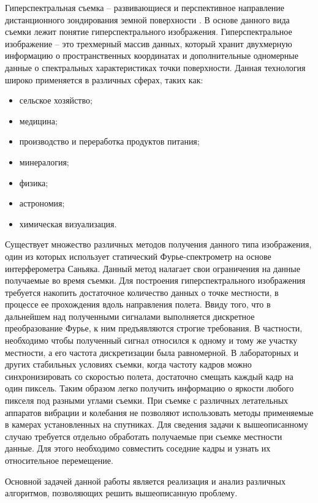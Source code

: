 \label{sec:intro}
Гиперспектральная съемка -- развивающиеся и перспективное направление дистанционного зондирования земной поверхности \cite{Cvet_2016}. В основе данного вида съемки лежит понятие гиперспектрального изображения. Гиперспектральное изображение -- это трехмерный массив данных, который хранит двухмерную информацию о пространственных координатах и дополнительные одномерные данные о спектральных характеристиках точки поверхности. Данная технология широко применяется в различных сферах, таких как:
\begin{itemize}
    \item сельское хозяйство;
    \item медицина;
    \item производство и переработка продуктов питания;
    \item минералогия;
    \item физика;
    \item астрономия;
    \item химическая визуализация.
\end{itemize}
Существует множество различных методов получения данного типа изображения, один из которых использует статический Фурье-спектрометр на основе интерферометра Саньяка. Данный метод налагает свои ограничения на данные получаемые во время съемки. Для построения гиперспектрального изображения требуется накопить достаточное количество данных о точке местности, в процессе ее прохождения вдоль направления полета. Ввиду того, что в дальнейшем над полученными сигналами выполняется дискретное преобразование Фурье, к ним предъявляются строгие требования. В частности, необходимо чтобы полученный сигнал относился к одному и тому же участку местности, а его частота дискретизации была равномерной. В лабораторных и других стабильных условиях съемки, когда частоту кадров можно синхронизировать со скоростью полета, достаточно смещать каждый кадр на один пиксель. Таким образом легко получить информацию о яркости любого пикселя под разными углами съемки. При съемке с различных летательных аппаратов вибрации и колебания не позволяют использовать методы применяемые в камерах установленных на спутниках. Для сведения задачи к вышеописанному случаю требуется отдельно обработать получаемые при съемке местности данные. Для этого необходимо совместить соседние кадры и узнать их относительное перемещение. 

Основной задачей данной работы является реализация и анализ различных алгоритмов, позволяющих решить вышеописанную проблему.

